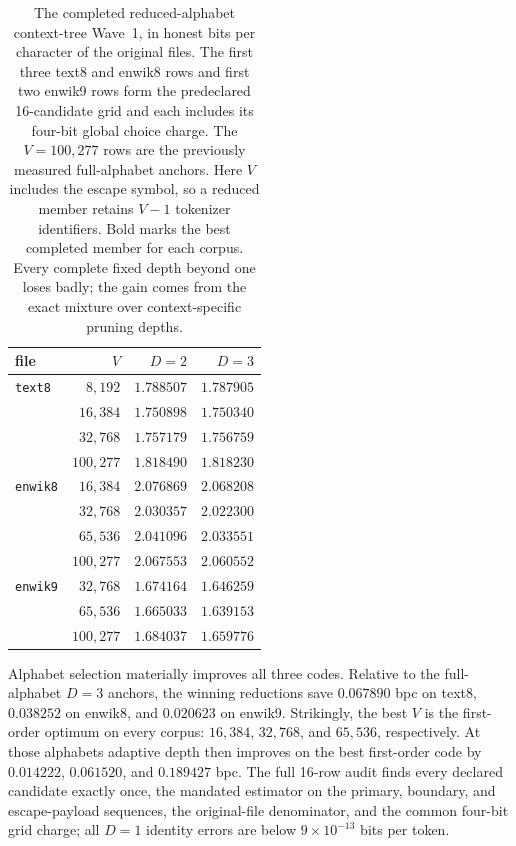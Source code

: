 \documentclass[11pt]{article}
\begin{document}
\begin{table}[ht]
\centering
\begin{tabular}{lrrr}
\toprule
file & $V$ & $D=2$ & $D=3$ \\
\midrule
\texttt{text8}  & $8{,}192$   & $1.788507$ & $1.787905$ \\
                 & $16{,}384$  & $1.750898$ & $\mathbf{1.750340}$ \\
                 & $32{,}768$  & $1.757179$ & $1.756759$ \\
                 & $100{,}277$ & $1.818490$ & $1.818230$ \\
\addlinespace
\texttt{enwik8} & $16{,}384$  & $2.076869$ & $2.068208$ \\
                 & $32{,}768$  & $2.030357$ & $\mathbf{2.022300}$ \\
                 & $65{,}536$  & $2.041096$ & $2.033551$ \\
                 & $100{,}277$ & $2.067553$ & $2.060552$ \\
\addlinespace
\texttt{enwik9} & $32{,}768$  & $1.674164$ & $1.646259$ \\
                 & $65{,}536$  & $1.665033$ & $\mathbf{1.639153}$ \\
                 & $100{,}277$ & $1.684037$ & $1.659776$ \\
\bottomrule
\end{tabular}
\caption{The completed reduced-alphabet context-tree Wave~1, in honest bits
  per character of the original files.  The first three text8 and enwik8
  rows and first two enwik9 rows form the predeclared 16-candidate grid and
  each includes its four-bit global choice charge.  The $V=100{,}277$ rows
  are the previously measured full-alphabet anchors.  Here $V$ includes the
  escape symbol, so a reduced member retains $V-1$ tokenizer identifiers.
  Bold marks the best completed member for each corpus.  Every complete fixed
  depth beyond one loses badly; the gain comes from the exact mixture over
  context-specific pruning depths.}
\label{tab:ctw}
\end{table}

Alphabet selection materially improves all three codes.  Relative to the
full-alphabet $D=3$ anchors, the winning reductions save $0.067890$ bpc on
text8, $0.038252$ on enwik8, and $0.020623$ on enwik9.  Strikingly, the best
$V$ is the first-order optimum on every corpus: $16{,}384$, $32{,}768$, and
$65{,}536$, respectively.  At those alphabets adaptive depth then improves
on the best first-order code by $0.014222$, $0.061520$, and $0.189427$ bpc.
The full 16-row audit finds every declared candidate exactly once, the
mandated estimator on the primary, boundary, and escape-payload sequences,
the original-file denominator, and the common four-bit grid charge; all
$D=1$ identity errors are below $9\mathbin{\times}10^{-13}$ bits per token.
\end{document}
